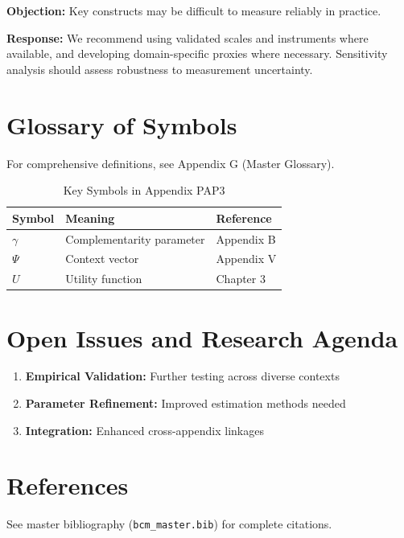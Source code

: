 \textbf{Objection:} Key constructs may be difficult to measure reliably in
practice.

\textbf{Response:} We recommend using validated scales and instruments where
available, and developing domain-specific proxies where necessary. Sensitivity
analysis should assess robustness to measurement uncertainty.



\section{Glossary of Symbols}
\label{sec:pap3-glossary}

For comprehensive definitions, see Appendix G (Master Glossary).

\begin{table}[htbp]
\centering
\caption{Key Symbols in Appendix PAP3}
\begin{tabular}{lll}
\toprule
\textbf{Symbol} & \textbf{Meaning} & \textbf{Reference} \\
\midrule
$\gamma$ & Complementarity parameter & Appendix B \\
$\Psi$ & Context vector & Appendix V \\
$U$ & Utility function & Chapter 3 \\
\bottomrule
\end{tabular}
\end{table}



\section{Open Issues and Research Agenda}
\label{sec:x-open}

\begin{enumerate}
    \item \textbf{Empirical Validation:} Further testing across diverse contexts
    \item \textbf{Parameter Refinement:} Improved estimation methods needed
    \item \textbf{Integration:} Enhanced cross-appendix linkages
\end{enumerate}

\section{References}
\label{sec:references}

See master bibliography (\texttt{bcm\_master.bib}) for complete citations.

\nocite{bcm_master}


